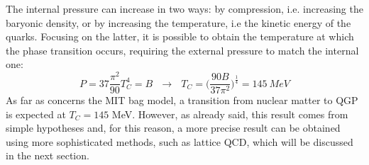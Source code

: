 The internal pressure can increase in two ways: by compression, i.e. increasing the baryonic density, or by increasing the temperature, i.e the kinetic energy of the quarks. Focusing on the latter, it is possible to obtain the temperature at which the phase transition occurs, requiring the external pressure to match the internal one: 
%
\begin{equation}
  P = 37 \frac{\pi^{2}}{90}T^{4}_{C} = B \ \ \ \longrightarrow \ \ \ T_{C} = \Big(\frac{90B}{37\pi^{2}}\Big)^{\frac{1}{4}}= 145 \ MeV
\end{equation}
%
As far as concerns the MIT bag model, a transition from nuclear matter to QGP is expected at $T_{C} = 145$ MeV. However, as already said, this result comes from simple hypotheses and, for this reason, a more precise result can be obtained using more sophisticated methods, such as lattice QCD, which will be discussed in the next section.\\

